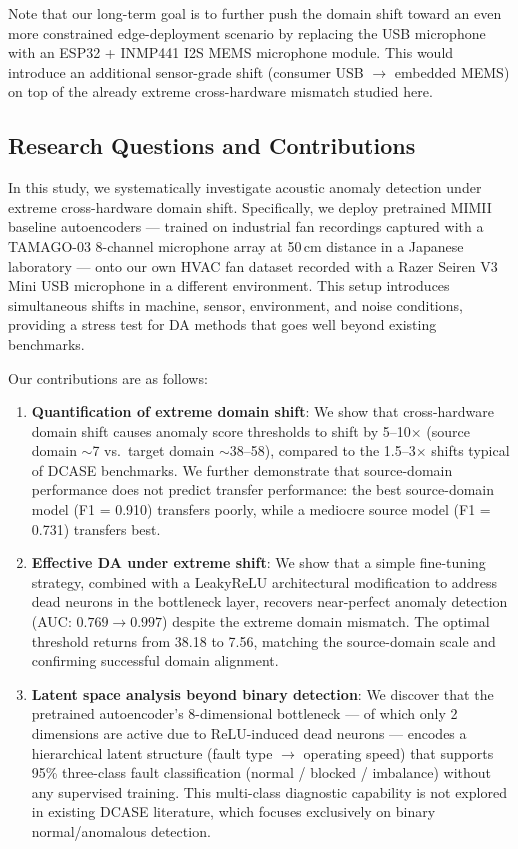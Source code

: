 \documentclass[12pt, a4paper]{article}
\begin{document}
Note that our long-term goal is to further push the domain shift toward an even more constrained edge-deployment scenario by replacing the USB microphone with an ESP32 + INMP441 I2S MEMS microphone module. This would introduce an additional sensor-grade shift (consumer USB $\rightarrow$ embedded MEMS) on top of the already extreme cross-hardware mismatch studied here.

\subsection{Research Questions and Contributions}

In this study, we systematically investigate acoustic anomaly detection under extreme cross-hardware domain shift. Specifically, we deploy pretrained MIMII baseline autoencoders --- trained on industrial fan recordings captured with a TAMAGO-03 8-channel microphone array at 50\,cm distance in a Japanese laboratory --- onto our own HVAC fan dataset recorded with a Razer Seiren V3 Mini USB microphone in a different environment. This setup introduces simultaneous shifts in machine, sensor, environment, and noise conditions, providing a stress test for DA methods that goes well beyond existing benchmarks.

Our contributions are as follows:

\begin{enumerate}
    \item \textbf{Quantification of extreme domain shift}: We show that cross-hardware domain shift causes anomaly score thresholds to shift by 5--10$\times$ (source domain $\sim$7 vs.\ target domain $\sim$38--58), compared to the 1.5--3$\times$ shifts typical of DCASE benchmarks. We further demonstrate that source-domain performance does not predict transfer performance: the best source-domain model (F1 = 0.910) transfers poorly, while a mediocre source model (F1 = 0.731) transfers best.

    \item \textbf{Effective DA under extreme shift}: We show that a simple fine-tuning strategy, combined with a LeakyReLU architectural modification to address dead neurons in the bottleneck layer, recovers near-perfect anomaly detection (AUC: $0.769 \rightarrow 0.997$) despite the extreme domain mismatch. The optimal threshold returns from 38.18 to 7.56, matching the source-domain scale and confirming successful domain alignment.

    \item \textbf{Latent space analysis beyond binary detection}: We discover that the pretrained autoencoder's 8-dimensional bottleneck --- of which only 2 dimensions are active due to ReLU-induced dead neurons --- encodes a hierarchical latent structure (fault type $\rightarrow$ operating speed) that supports 95\% three-class fault classification (normal / blocked / imbalance) without any supervised training. This multi-class diagnostic capability is not explored in existing DCASE literature, which focuses exclusively on binary normal/anomalous detection.
\end{enumerate}
\end{document}
